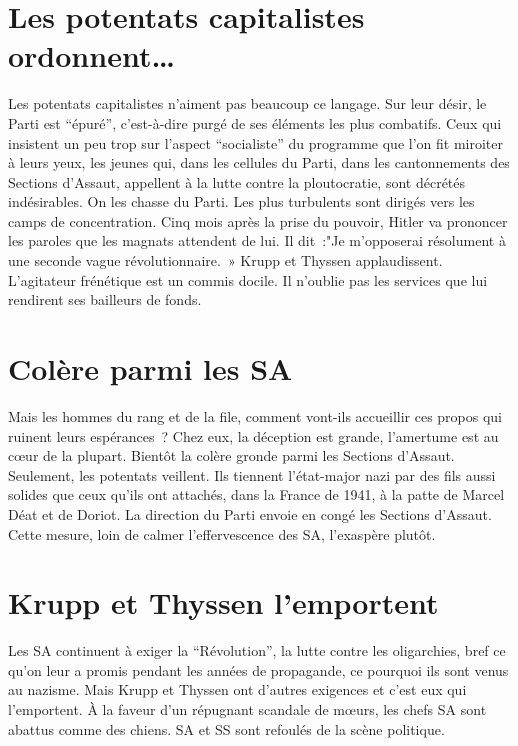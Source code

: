\documentclass[french,twoside]{book} %
\begin{document}
\section[Les potentats capitalistes ordonnent…]{Les potentats capitalistes ordonnent…}
\noindent Les potentats capitalistes n’aiment pas beaucoup ce langage. Sur leur désir, le Parti est “épuré”, c’est-à-dire purgé de ses éléments les plus combatifs. Ceux qui insistent un peu trop sur l’aspect “socialiste” du programme que l’on fit miroiter à leurs yeux, les jeunes qui, dans les cellules du Parti, dans les cantonnements des Sections d’Assaut, appellent à la lutte contre la ploutocratie, sont décrétés indésirables. On les chasse du Parti. Les plus turbulents sont dirigés vers les camps de concentration. Cinq mois après la prise du pouvoir, Hitler va prononcer les paroles que les magnats attendent de lui. Il dit :"Je m’opposerai résolument à une seconde vague révolutionnaire. » Krupp et Thyssen applaudissent. L’agitateur frénétique est un commis docile. Il n’oublie pas les services que lui rendirent ses bailleurs de fonds.
\section[Colère parmi les SA]{Colère parmi les SA}
\noindent Mais les hommes du rang et de la file, comment vont-ils accueillir ces propos qui ruinent leurs espérances ? Chez eux, la déception est grande, l’amertume est au cœur de la plupart. Bientôt la colère gronde parmi les Sections d’Assaut. Seulement, les potentats veillent. Ils tiennent l’état-major nazi par des fils aussi solides que ceux qu’ils ont attachés, dans la France de 1941, à la patte de Marcel Déat et de Doriot. La direction du Parti envoie en congé les Sections d’Assaut. Cette mesure, loin de calmer l’effervescence des SA, l’exaspère plutôt.
\section[Krupp et Thyssen l’emportent]{Krupp et Thyssen l’emportent}
\noindent Les SA continuent à exiger la “Révolution”, la lutte contre les oligarchies, bref ce qu’on leur a promis pendant les années de propagande, ce pourquoi ils sont venus au nazisme. Mais Krupp et Thyssen ont d’autres exigences et c’est eux qui l’emportent. À la faveur d’un répugnant scandale de mœurs, les chefs SA sont abattus comme des chiens. SA et SS sont refoulés de la scène politique.
\end{document}
